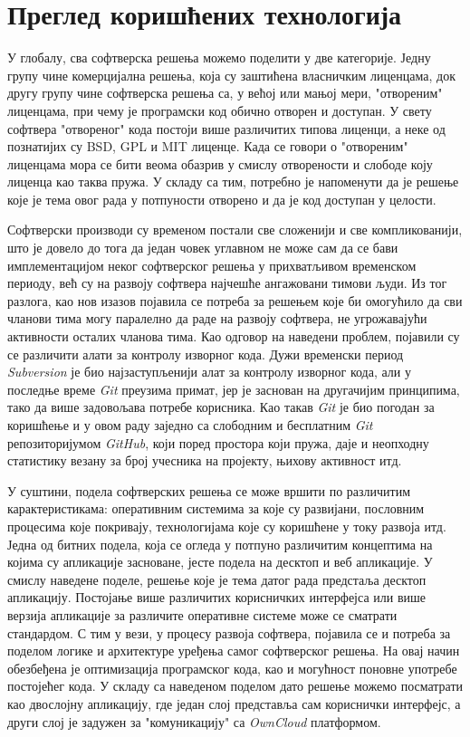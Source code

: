 \chapter{Преглед коришћених технологија}
\label{chap:Pregled koriscenih tehnologija}

У глобалу, сва софтверска решења можемо поделити у две категорије. Једну групу чине комерцијална решења, која су заштићена власничким лиценцама, док другу групу чине софтверска решења са, у већој или мањој мери, "отвореним" лиценцама, при чему је програмски код обично отворен и доступан. У свету софтвера "отвореног" кода постоји више различитих типова лиценци, а неке од познатијих су BSD, GPL и MIT\cite{licence} лиценце. Када се говори о "отвореним" лиценцама мора се бити веома обазрив у смислу отворености и слободе коју лиценца као таква пружа. У складу са тим, потребно је напоменути да је решење које је тема овог рада у потпуности отворено и да је код доступан у целости. 

Софтверски производи су временом постали све сложенији и све компликованији, што је довело до тога да један човек углавном не може сам да се бави имплементацијом неког софтверског решења у прихватљивом временском периоду, већ су на развоју софтвера најчешће ангажовани тимови људи. Из тог разлога, као нов изазов појавила се потреба за решењем које би омогућило да сви чланови тима могу паралелно да раде на развоју софтвера, не угрожавајући активности осталих чланова тима. Као одговор на наведени проблем, појавили су се различити алати за контролу изворног кода. Дужи временски период \textit{Subversion} је био најзаступљенији алат за контролу изворног кода, али у последње време \textit{Git}\cite{git} преузима примат, јер је заснован на другачијим принципима, тако да више задовољава потребе корисника. Као такав \textit{Git} је био погодан за коришћење и у овом раду заједно са слободним и бесплатним \textit{Git} репозиторијумом \textit{GitHub}\cite{github}, који поред простора који пружа, даје и неопходну статистику везану за број учесника на пројекту, њихову активност итд.

У суштини, подела софтверских решења се може  вршити по различитим карактеристикама: оперативним системима за које су развијани, пословним процесима које покривају, технологијама које су коришћене у току развоја итд. Једна од битних подела, која се огледа у потпуно различитим концептима на којима су апликације засноване, јесте подела на десктоп и веб апликације. У смислу наведене поделе, решење које је тема датог рада предстаља десктоп апликацију. Постојање више различитих корисничких интерфејса или више верзија апликације за различите оперативне системе може се сматрати стандардом. С тим у вези, у процесу развоја софтвера, појавила се и потреба за поделом логике и архитектуре уређења самог софтверског решења. На овај начин обезбеђена је оптимизација програмског кода, као и могућност поновне употребе постојећег кода. У складу са наведеном поделом дато решење можемо посматрати као двослојну апликацију, где један слој представља сам кориснички интерфејс, а други слој је задужен за "комуникацију" са \textit{OwnCloud} платформом. 


